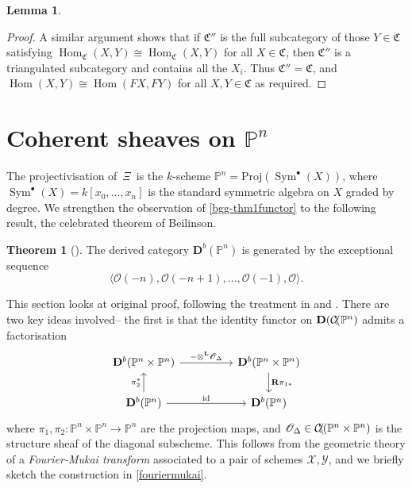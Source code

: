 \documentclass[a4paper]{article}
\theoremstyle{definition}
\newtheorem*{theorem*}{Theorem}
\newtheorem{lemma}[defn]{Lemma}
\theoremstyle{remark}
\DeclareMathOperator{\Sym}{\text{Sym}}
\DeclareMathOperator{\Hom}{\text{Hom}}
\newcommand{\deri}{\mathbf{D}}
\newcommand{\deritensor}{\ensuremath{\otimes^\mathbf{L}}}
\newcommand{\Proj}{\ensuremath{\text{Proj}}}
\newcommand{\Pn}{\ensuremath{{\mathbb{P}^n}}}
\DeclareMathOperator{\coh}{\mathcal{C\kern -2pt o\kern -2pt h\kern -1pt}}
\begin{document}
\begin{lemma}
\begin{proof}
        A similar argument shows that if \(\mathfrak{C}''\) is the full
        subcategory of those \(Y\in \mathfrak{C}\) satisfying
        \(\Hom_\mathfrak{C}(X, Y)\cong \Hom_\mathfrak{C}(X,Y)\) for all \(X\in
        \mathfrak{C}\), then \(\mathfrak{C}''\) is a triangulated subcategory
        and contains all the \(X_i\). Thus \(\mathfrak{C}''=\mathfrak{C}\), and
        \(\Hom(X,Y)\cong \Hom(FX,FY)\) for all \(X,Y\in \mathfrak{C}\) as
        required.
    \end{proof}
\end{lemma}

\section{Coherent sheaves on \Pn}\label{sec-cohPn}

The projectivisation of \(\,\Xi\,\) is the \(k\)-scheme
\(\Pn=\Proj(\Sym^\bullet(X))\), where \(\Sym^\bullet(X)=k[x_0,...,x_n]\) is the
standard symmetric algebra on \(X\) graded by degree. We strengthen the
observation of \cref{bgg-thm1functor} to the following result, the celebrated
theorem of Beilinson. 
\begin{theorem*}[]
    The derived category \(\deri^b(\Pn)\) is generated by the exceptional
    sequence \[\langle \mathscr{O}(-n), \mathscr{O}(-n+1),..., \mathscr{O}(-1),
    \mathscr{O} \rangle.\]
\end{theorem*}
This section looks at  original
proof, following the treatment in  and
.  There are two key ideas involved-- the
first is that the identity functor on \(\deri(\coh\Pn)\) admits a factorisation
\[\begin{tikzcd}[column sep=huge]
    \deri^b( \Pn\times \Pn) \arrow[r, "-\deritensor \mathscr{O}_\Delta"] 
    & \deri^b(\Pn\times \Pn) \arrow[d, "\mathbf{R}\pi_{1\ast}"] \\
    \deri^b(\Pn) \arrow[u,"\pi_2^\ast"] \arrow[r,"\text{id}"] &
    \deri^b(\Pn)
\end{tikzcd}\]
where \(\pi_1,\pi_2:\Pn\times \Pn\rightarrow \Pn\) are the projection maps, and
\(\mathscr{O}_\Delta\in \coh(\Pn \times \Pn)\) is the structure sheaf of the
diagonal subscheme. This follows from the geometric theory of a
\textit{Fourier-Mukai transform} associated to a pair of schemes
\(\mathscr{X},\mathscr{Y}\), and we briefly sketch the construction in
\cref{fouriermukai}. 
\end{document}
